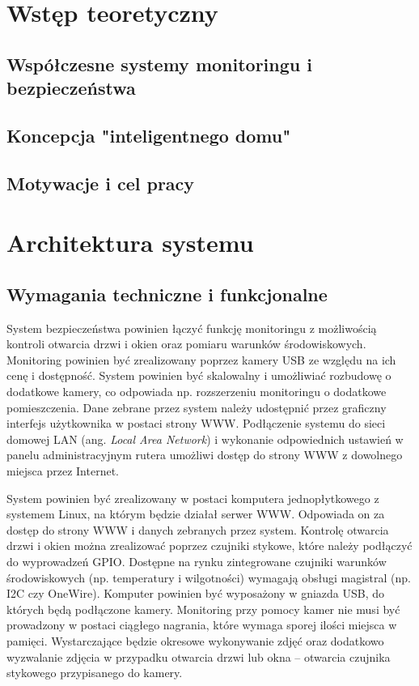 \documentclass[a4paper,12pt,twoside]{article}
\begin{document}


\tableofcontents
\setcounter{tocdepth}{2}
\newpage

\section{Wstęp teoretyczny}

\subsection{Współczesne systemy monitoringu i bezpieczeństwa}

\subsection{Koncepcja "inteligentnego domu"}

\subsection{Motywacje i cel pracy}

\newpage
\section{Architektura systemu}

\subsection{Wymagania techniczne i funkcjonalne}
System bezpieczeństwa powinien łączyć funkcję monitoringu z możliwością kontroli otwarcia drzwi i okien oraz pomiaru warunków środowiskowych. Monitoring powinien być zrealizowany poprzez kamery USB ze względu na ich cenę i dostępność. System powinien być skalowalny i umożliwiać rozbudowę o dodatkowe kamery, co odpowiada np. rozszerzeniu monitoringu o dodatkowe pomieszczenia. Dane zebrane przez system należy udostępnić przez graficzny interfejs użytkownika w postaci strony WWW. Podłączenie systemu do sieci domowej LAN (ang. \textit{Local Area Network}) i wykonanie odpowiednich ustawień w panelu administracyjnym rutera umożliwi dostęp do strony WWW z dowolnego miejsca przez Internet.

System powinien być zrealizowany w postaci komputera jednopłytkowego z systemem Linux, na którym będzie działał serwer WWW. Odpowiada on za dostęp do strony WWW i danych zebranych przez system. Kontrolę otwarcia drzwi i okien można zrealizować poprzez czujniki stykowe, które należy podłączyć do wyprowadzeń GPIO. Dostępne na rynku zintegrowane czujniki warunków środowiskowych (np. temperatury i wilgotności) wymagają obsługi magistral (np. I2C czy OneWire). Komputer powinien być wyposażony w gniazda USB, do których będą podłączone kamery. Monitoring przy pomocy kamer nie musi być prowadzony w postaci ciągłego nagrania, które wymaga sporej ilości miejsca w pamięci. Wystarczające będzie okresowe wykonywanie zdjęć oraz dodatkowo wyzwalanie zdjęcia w przypadku otwarcia drzwi lub okna -- otwarcia czujnika stykowego przypisanego do kamery. 
\end{document}
